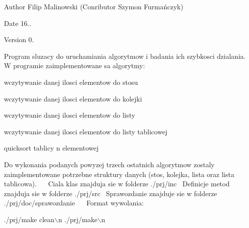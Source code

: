 \begin{DoxyAuthor}{Author}
Filip Malinowski (Conributor Szymon Furmańczyk) 
\end{DoxyAuthor}
\begin{DoxyDate}{Date}
16.. 
\end{DoxyDate}
\begin{DoxyVersion}{Version}
0.
\end{DoxyVersion}
Program sluzacy do uruchamiania algorytmow i badania ich szybkosci dzialania.~\newline
W programie zaimplementowane sa algorytmy\+:~\newline

\begin{DoxyItemize}
\item wczytywanie danej ilosci elementow do stosu~\newline

\item wczytywanie danej ilosci elementow do kolejki~\newline

\item wczytywanie danej ilosci elementow do listy~\newline

\item wczytywanie danej ilosci elementow do listy tablicowej~\newline

\item quicksort tablicy n elementowej
\end{DoxyItemize}

Do wykonania podanych powyzej trzech ostatnich algorytmow zostaly zaimplementowane potrzebne struktury danych (stos, kolejka, lista oraz lista tablicowa).~\newline
~\newline
Ciala klas znajduja sie w folderze ./prj/inc~\newline
Definicje metod znajduja sie w folderze ./prj/src~\newline
Sprawozdanie znajduje sie w folderze ./prj/doc/sprawozdanie~\newline
~\newline
Format wywolania\+:~\newline

\begin{DoxyCode}
./prj/make clean\(\backslash\)n
./prj/make\(\backslash\)n
\end{DoxyCode}
 